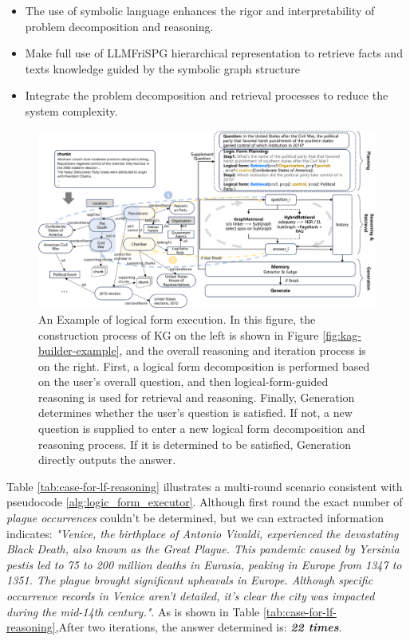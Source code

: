 \documentclass{article}
\begin{document}
\begin{itemize}
    \item The use of symbolic language enhances the rigor and interpretability of problem decomposition and reasoning.
    \item Make full use of LLMFriSPG hierarchical representation to retrieve facts and texts knowledge guided by the symbolic graph structure
    \item Integrate the problem decomposition and retrieval processes to reduce the system complexity.
\end{itemize}   

\begin{figure}[htbp]
    \centering
    \includegraphics[width=0.9\linewidth]{figures/logic_form.png}
    \caption{An Example of logical form execution. In this figure, the construction process of KG on the left is shown in Figure \ref{fig:kag-builder-example}, and the overall reasoning and iteration process is on the right. First, a logical form decomposition is performed based on the user's overall question, and then logical-form-guided reasoning is used for retrieval and reasoning. Finally, Generation determines whether the user's question is satisfied. If not, a new question is supplied to enter a new logical form decomposition and reasoning process. If it is determined to be satisfied, Generation directly outputs the answer.}
    \label{fig:example_of_logic_form}
\end{figure}


Table \ref{tab:case-for-lf-reasoning} illustrates a multi-round scenario consistent with pseudocode \ref{alg:logic_form_executor}. Although first round the exact number of \textit{plague occurrences} couldn't be determined, but we can extracted information indicates: \textit{"Venice, the birthplace of Antonio Vivaldi, experienced the devastating Black Death, also known as the Great Plague. This pandemic caused by Yersinia pestis led to 75 to 200 million deaths in Eurasia, peaking in Europe from 1347 to 1351. The plague brought significant upheavals in Europe. Although specific occurrence records in Venice aren't detailed, it's clear the city was impacted during the mid-14th century."}. As is shown in Table \ref{tab:case-for-lf-reasoning},After two iterations, the answer determined is: \textit{\textbf{22 times}}.
\end{document}
